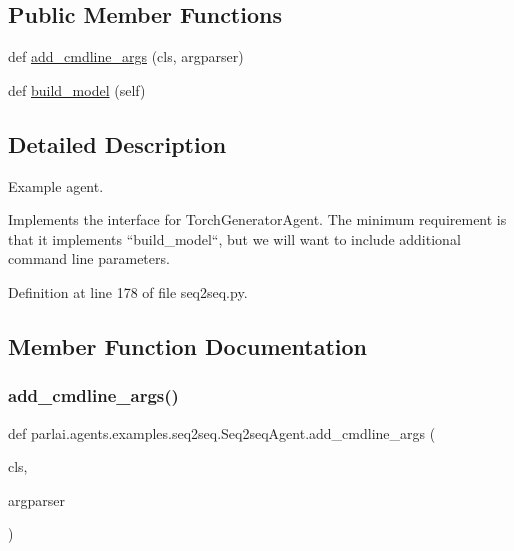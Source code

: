 \subsection*{Public Member Functions}
\begin{DoxyCompactItemize}
\item 
def \hyperlink{classparlai_1_1agents_1_1examples_1_1seq2seq_1_1Seq2seqAgent_a1612b8d70c47a2e4ce3a38f6c7ef14c3}{add\+\_\+cmdline\+\_\+args} (cls, argparser)
\item 
def \hyperlink{classparlai_1_1agents_1_1examples_1_1seq2seq_1_1Seq2seqAgent_a8fb044759c577db92eb9fb72865f0f72}{build\+\_\+model} (self)
\end{DoxyCompactItemize}


\subsection{Detailed Description}
\begin{DoxyVerb}Example agent.

Implements the interface for TorchGeneratorAgent. The minimum requirement is that it
implements ``build_model``, but we will want to include additional command line
parameters.
\end{DoxyVerb}
 

Definition at line 178 of file seq2seq.\+py.



\subsection{Member Function Documentation}
\mbox{\label{classparlai_1_1agents_1_1examples_1_1seq2seq_1_1Seq2seqAgent_a1612b8d70c47a2e4ce3a38f6c7ef14c3}} 
\subsubsection{\texorpdfstring{add\+\_\+cmdline\+\_\+args()}{add\_cmdline\_args()}}
{\footnotesize\ttfamily def parlai.\+agents.\+examples.\+seq2seq.\+Seq2seq\+Agent.\+add\+\_\+cmdline\+\_\+args (\begin{DoxyParamCaption}\item[{}]{cls,  }\item[{}]{argparser }\end{DoxyParamCaption})}

